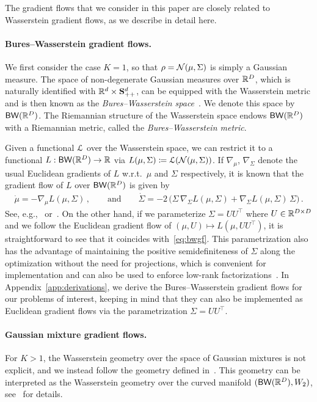 \documentclass{custom}
\begin{document}
The gradient flows that we consider in this paper are closely related to Wasserstein gradient flows, as we describe in detail here.

\paragraph*{Bures--Wasserstein gradient flows.}
We first consider the case $K = 1$, so that $\rho = \mathcal N(\mu,\Sigma)$ is simply a Gaussian measure.
The space of non-degenerate Gaussian measures over $\mathbb R^D$, which is naturally identified with $\mathbb R^d\times \mathbf{S}_{++}^d$, can be equipped with the Wasserstein metric and is then known as the \emph{Bures--Wasserstein space}~\citep{BhaJaiLim19BW}. We denote this space by $\mathsf{BW}(\mathbb R^D)$. The Riemannian structure of the Wasserstein space endows $\mathsf{BW}(\mathbb R^D)$ with a Riemannian metric, called the \emph{Bures--Wasserstein metric}.

Given a functional $\EuScript{L}$ over the Wasserstein space, we can restrict it to a functional $L : \mathsf{BW}(\mathbb R^D) \to \mathbb R$ via $L(\mu,\Sigma) \coloneqq \EuScript{L}(\mathcal N(\mu,\Sigma))$.
If $\nabla_\mu$, $\nabla_\Sigma$ denote the usual Euclidean gradients of $L$ w.r.t.\ $\mu$ and $\Sigma$ respectively, it is known that the gradient flow of $L$ over $\mathsf{BW}(\mathbb R^D)$ is given by
\begin{align}\label{eq:bwgf}
    \boxed{\dot \mu = -\nabla_\mu L(\mu,\Sigma)\,,} \qquad\text{and}\qquad \boxed{\dot\Sigma = -2\,\bigl(\Sigma\,\nabla_\Sigma L(\mu,\Sigma) + \nabla_\Sigma L(\mu,\Sigma)\,\Sigma\bigr)\,.}
\end{align}
See, e.g.,~\citet[Appendix A]{altschuler2021averaging} or~\citet[Appendix B.3]{Lam+22GVI}.
On the other hand, if we parameterize $\Sigma = UU^\top$ where $U \in \mathbb R^{D\times D}$ and we follow the Euclidean gradient flow of $(\mu,U) \mapsto L(\mu,UU^\top)$, it is straightforward to see that it
coincides with~\eqref{eq:bwgf}.
This parametrization also has the advantage of maintaining the positive semidefiniteness of $\Sigma$ along the optimization without the need for projections, which is convenient for implementation and can also be used to enforce low-rank factorizations~\citep{BurMon03LowRank}.
In Appendix~\ref{app:derivations}, we derive the Bures--Wasserstein gradient flows for our problems of interest, keeping in mind that they can also be implemented as Euclidean gradient flows via the parametrization $\Sigma = UU^\top$.

\paragraph{Gaussian mixture gradient flows.}
For $K > 1$, the Wasserstein geometry over the space of Gaussian mixtures is not explicit, and we instead follow the geometry defined in~\citet{CheGeoTan19GMM, DelDes20GMM}.
This geometry can be interpreted as the Wasserstein geometry over the curved manifold $(\mathsf{BW}(\mathbb R^D), W_2)$, see~\citet[Appendix F]{Lam+22GVI} for details.
\end{document}
